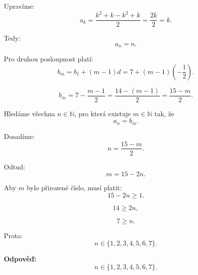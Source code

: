 \documentclass[12pt,a4paper]{article}
\begin{document}
Upravíme:
\[
a_k=\frac{k^2+k-k^2+k}{2}=\frac{2k}{2}=k.
\]

Tedy:
\[
a_n=n.
\]

\medskip

Pro druhou posloupnost platí:
\[
b_m=b_1+(m-1)d=7+(m-1)\left(-\frac12\right).
\]

\[
b_m=7-\frac{m-1}{2}=\frac{14-(m-1)}{2}=\frac{15-m}{2}.
\]

Hledáme všechna \(n\in\mathbb{N}\), pro která existuje \(m\in\mathbb{N}\) tak, že
\[
a_n=b_m.
\]

Dosadíme:
\[
n=\frac{15-m}{2}.
\]

Odtud:
\[
m=15-2n.
\]

Aby \(m\) bylo přirozené číslo, musí platit:
\[
15-2n\ge 1.
\]

\[
14\ge 2n,
\]

\[
7\ge n.
\]

Proto:
\[
n\in\{1,2,3,4,5,6,7\}.
\]

\bigskip

\textbf{Odpověď:}
\[
n\in\{1,2,3,4,5,6,7\}.
\]
\end{document}

